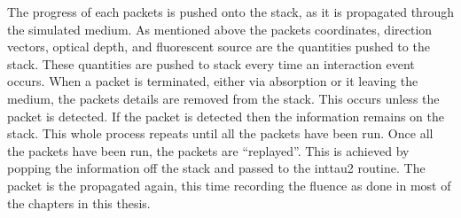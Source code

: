 \begin{appendices}
The progress of each packets is pushed onto the stack, as it is propagated through the simulated medium. 
As mentioned above the packets coordinates, direction vectors, optical depth, and fluorescent source are the quantities pushed to the stack.
These quantities are pushed to stack every time an interaction event occurs.
When a packet is terminated, either via absorption or it leaving the medium, the packets details are removed from the stack.
This occurs unless the packet is detected.
If the packet is detected then the information remains on the stack.
This whole process repeats until all the packets have been run.
Once all the packets have been run, the packets are ``replayed''.
This is achieved by popping the information off the stack and passed to the inttau2 routine.
The packet is the propagated again, this time recording the fluence as done in most of the chapters in this thesis.

\end{appendices}
